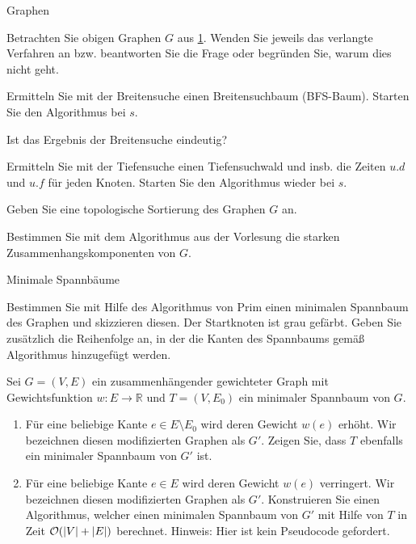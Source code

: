 \documentclass{exercisesheet}
\begin{document}
\begin{eexercises}{Graphen}{
    Betrachten Sie obigen Graphen $G$ aus \ref{fig:simplegraph}. Wenden Sie jeweils das verlangte Verfahren an bzw. beantworten Sie die Frage oder begründen Sie, warum dies nicht geht.
    \begin{figure}[ht]\label{fig:simplegraph}
    \end{figure}
  }
  \item Ermitteln Sie mit der Breitensuche einen Breitensuchbaum (BFS-Baum). Starten Sie den Algorithmus bei $s$.
  \item Ist das Ergebnis der Breitensuche eindeutig?
  \item Ermitteln Sie mit der Tiefensuche einen Tiefensuchwald und insb. die Zeiten $u.d$ und $u.f$ für jeden Knoten. Starten Sie den Algorithmus wieder bei $s$.
  \item Geben Sie eine topologische Sortierung des Graphen $G$ an.
  \item Bestimmen Sie mit dem Algorithmus aus der Vorlesung die starken Zusammenhangskomponenten von $G$.
\end{eexercises}

\begin{eexercises}{Minimale Spannbäume}{
  }
  \item Bestimmen Sie mit Hilfe des Algorithmus von Prim einen minimalen Spannbaum des Graphen und skizzieren diesen. Der Startknoten ist grau gefärbt. Geben Sie zusätzlich die Reihenfolge an, in der die Kanten des Spannbaums gemäß Algorithmus hinzugefügt werden.
  \item Sei $G = (V, E)$ ein zusammenhängender gewichteter Graph mit Gewichtsfunktion $w : E \rightarrow \mathbb{R}$ und $T = (V, E_0)$ ein minimaler Spannbaum von $G$.
  \begin{enumerate}
    \item Für eine beliebige Kante $e \in E \setminus E_0$ wird deren Gewicht $w(e)$ erhöht. Wir bezeichnen diesen modifizierten Graphen als $G'$. Zeigen Sie, dass $T$ ebenfalls ein minimaler Spannbaum von $G'$ ist.
    \item Für eine beliebige Kante $e \in E$ wird deren Gewicht $w(e)$ verringert. Wir bezeichnen diesen modifizierten Graphen als $G'$. Konstruieren Sie einen Algorithmus, welcher einen minimalen Spannbaum von $G'$ mit Hilfe von $T$ in Zeit $\mathcal{O}(|V| + |E|)$ berechnet. Hinweis: Hier ist kein Pseudocode gefordert.
  \end{enumerate}
\end{eexercises}
\end{document}
